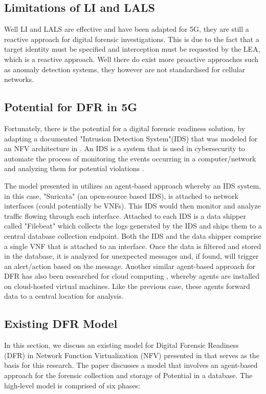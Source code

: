 \documentclass[final,1p,times,authoryear]{elsarticle}
\begin{document}
\subsection{Limitations of LI and LALS}
\label{sub2sec5}
Well LI and LALS are effective and have been adapted for 5G, they are still a reactive approach for digital forensic investigations. This is due to the fact that a target identity must be specified and interception must be requested by the LEA, which is a reactive approach. Well there do exist more proactive approaches such as anomaly detection systems, they however are not standardised for cellular networks.

\subsection{Potential for DFR in 5G}
\label{sub2sec6}
Fortunately, there is the potential for a digital forensic readiness solution, by adapting a documented "Intrusion Detection System"(IDS) that was modeled for an NFV architecture in \citep{behnke2019nfv}. An IDS is a system that is used in cybersecurity to automate the process of monitoring the events occurring in a computer/network and analyzing them for potential violations \citep{scarfone2007guide}.

\vspace{1em}

The model presented in \citep{behnke2019nfv} utilizes an agent-based approach whereby an IDS system, in this case, "Suricata" (an open-source based IDS), is attached to network interfaces (could potentially be VNFs). This IDS would then monitor and analyze traffic flowing through each interface. Attached to each IDS is a data shipper called "Filebeat" which collects the logs generated by the IDS and ships them to a central database collection endpoint. Both the IDS and the data shipper comprise a single VNF that is attached to an interface. Once the data is filtered and stored in the database, it is analyzed for unexpected messages and, if found, will trigger an alert/action based on the message. Another similar agent-based approach for DFR has also been researched for cloud computing \citep{kebande2018digital}, whereby agents are installed on cloud-hosted virtual machines. Like the previous case, these agents forward data to a central location for analysis.

\subsection{Existing DFR Model}
\label{sub2sec7}
In this section, we discuss an existing model for Digital Forensic Readiness (DFR) in Network Function Virtualization (NFV) presented in \citep{makura2024towards} that serves as the basis for this research. The paper discusses a model that involves an agent-based approach for the forensic collection and storage of Potential in a database. The high-level model is comprised of six phases:
\end{document}
